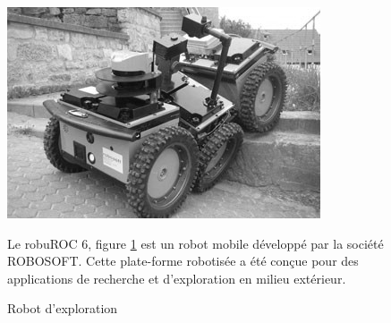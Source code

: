 \begin{figure}[htbp]
\begin{minipage}[c]{.35\linewidth}
\begin{center}
\includegraphics[width=\linewidth]{img/Robot1.png}
\caption{Robot d'exploration}
\label{fig:image12}
\end{center}
\end{minipage}
\hfill
\begin{minipage}[c]{.6\linewidth}
Le robuROC 6, figure \ref{fig:image12} est un robot mobile développé par la société ROBOSOFT. Cette plate-forme robotisée a été conçue pour des applications de recherche et d'exploration en milieu extérieur.
\end{minipage}
\end{figure}

